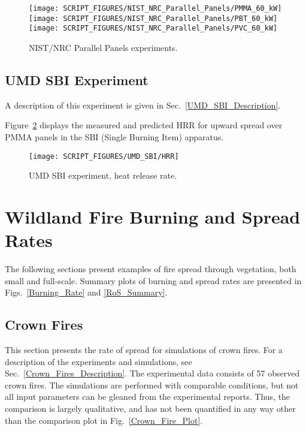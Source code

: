 \begin{figure}[!ht]
\centering
\texttt{[image: SCRIPT\_FIGURES/NIST\_NRC\_Parallel\_Panels/PMMA\_60\_kW]} \\
\texttt{[image: SCRIPT\_FIGURES/NIST\_NRC\_Parallel\_Panels/PBT\_60\_kW]} \\
\texttt{[image: SCRIPT\_FIGURES/NIST\_NRC\_Parallel\_Panels/PVC\_60\_kW]}
\caption[NIST/NRC Parallel Panels experiments]{NIST/NRC Parallel Panels experiments.}
\label{NIST_NRC_PP_HRR}
\end{figure}


\clearpage

\subsection{UMD SBI Experiment}

A description of this experiment is given in Sec.~\ref{UMD_SBI_Description}.

Figure~\ref{UMD_SBI_HRR} displays the measured and predicted HRR for upward spread over PMMA panels in the SBI (Single Burning Item) apparatus. 

\begin{figure}[!ht]
\centering
\texttt{[image: SCRIPT\_FIGURES/UMD\_SBI/HRR]}
\caption[UMD SBI experiment, heat release rate]{UMD SBI experiment, heat release rate.}
\label{UMD_SBI_HRR}
\end{figure}



\clearpage

\section{Wildland Fire Burning and Spread Rates}
\label{WUI}

The following sections present examples of fire spread through vegetation, both small and full-scale. Summary plots of burning and spread rates are presented in Figs.~\ref{Burning_Rate} and \ref{RoS_Summary}.


\subsection{Crown Fires}

This section presents the rate of spread for simulations of crown fires. For a description of the experiments and simulations, see Sec.~\ref{Crown_Fires_Description}. The experimental data consists of 57 observed crown fires. The simulations are performed with comparable conditions, but not all input parameters can be gleaned from the experimental reports. Thus, the comparison is largely qualitative, and has not been quantified in any way other than the comparison plot in Fig.~\ref{Crown_Fire_Plot}.

